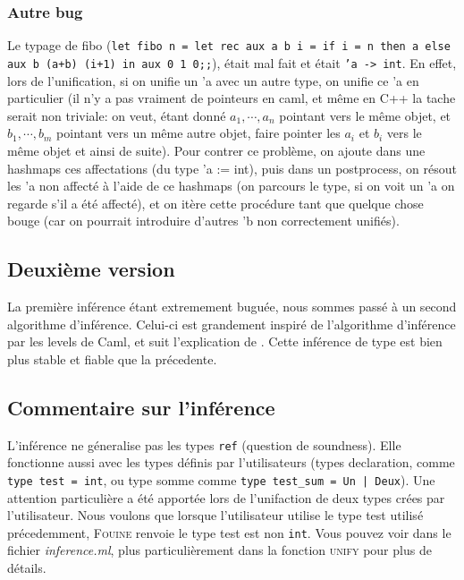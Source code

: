 \documentclass[paper=a4, fontsize=11pt, twocolumn]{article}
\begin{document}
\subsubsection{Autre bug}
Le typage de fibo (\texttt{let fibo n = let rec aux a b i = if i = n then a else aux b (a+b) (i+1) in aux 0 1 0;;}), était mal fait et était \texttt{'a -> int}. En effet, lors de l'unification, si on unifie un 'a avec un autre type, on unifie ce 'a en particulier (il n'y a pas vraiment de pointeurs en caml, et même en C++ la tache serait non triviale: on veut, étant donné $a_1,\cdots,a_n$ pointant vers le même objet, et $b_1, \cdots, b_m $ pointant vers un même autre objet, faire pointer les $a_i$ et $b_i$ vers le même objet et ainsi de suite). Pour contrer ce problème, on ajoute dans une hashmaps ces affectations (du type 'a := int), puis dans un postprocess, on résout les 'a non affecté à l'aide de ce hashmaps (on parcours le type, si on voit un 'a on regarde s'il a été affecté), et on itère cette procédure tant que quelque chose bouge (car on pourrait introduire d'autres 'b non correctement unifiés).

\subsection{Deuxième version}
La première inférence étant extremement buguée, nous sommes passé à un second algorithme d'inférence. Celui-ci est grandement inspiré de l'algorithme d'inférence par les levels de Caml, et suit l'explication de \cite{Type}. Cette inférence de type est bien plus stable et fiable que la précedente.

\subsection{Commentaire sur l'inférence}
L'inférence ne géneralise pas les types \texttt{ref} (question de soundness). Elle fonctionne aussi avec les types définis par l'utilisateurs (types declaration, comme \texttt{type test = int}, ou type somme comme \texttt{type test\_sum = Un | Deux}). Une attention particulière a été apportée lors de l'unifaction de deux types crées par l'utilisateur. Nous voulons que lorsque l'utilisateur utilise le type test utilisé précedemment, \textsc{Fouine} renvoie le type test est non \texttt{int}. Vous pouvez voir dans le fichier \textit{inference.ml}, plus particulièrement dans la fonction \textsc{unify} pour plus de détails.
\end{document}
